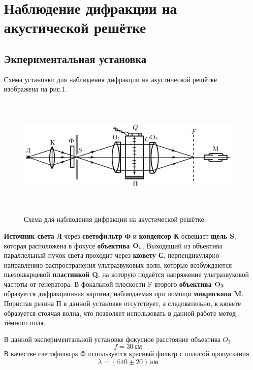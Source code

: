 \documentclass[12pt]{article}
\begin{document}
\section*{Наблюдение дифракции на акустической решётке}
\subsection*{Экпериментальная установка}
\par	
	Схема установки для наблюдения дифракции на акустической решётке изображена на рис.1.
\begin{figure}[h!]
	\centering
	\includegraphics[height = 6cm, width = 15cm]{image2.png}
	\caption{Схема для наблюдения дифракции на акустической решётке}
\end{figure}
\par
	{\bf Источник света Л} через {\bf светофильтр Ф} и {\bf конденсор К} освещает {\bf щель S}, которая расположена в фокусе {\bf объектива ${\bf O_1}$}. Выходящий из объектива параллельный пучок света проходит через {\bf кювету С}, перпендикулярно направлению распространения ультразвуковых волн, которые возбуждаются пьезокварцевой {\bf пластинкой Q}, на которую подаётся напряжение ультразвуковой частоты от генератора. В фокальной плоскости F второго {\bf объектива ${\bf O_2}$} образуется дифракционная картина, наблюдаемая при помощи {\bf микроскопа M}. Пористая резина П в данной установке отсутствует, а следовательно, в кювете образуется стоячая волна, что  позволяет использовать в данной работе метод тёмного поля.
\par
	В данной экспериментальной установке фокусное расстояние объектива $O_2$
\[
	f = 30 \, \text{см}
\]
	В качестве светофильтра Ф используется красный фильтр с полосой пропускания
\[
	\lambda = \left(640 \pm 20\right) \, \text{нм}
\]
\newpage
\end{document}
